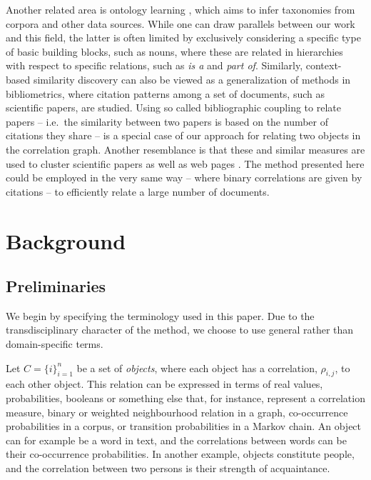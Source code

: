 \documentclass{kais}
\newcommand{\rn}[1]{\rho_{#1}}
\begin{document}
Another related area is ontology learning \cite{Wong2012ontology}, which aims to infer taxonomies 
from corpora and other data sources. While one can draw parallels between our work and this field, the latter is often limited 
by exclusively considering a specific type of basic building blocks, such as nouns, where these are related in 
 hierarchies with respect to specific relations, such as \emph{is a} and \emph{part of}. Similarly, context-based similarity
  discovery can also be viewed as a generalization of methods in bibliometrics, where citation patterns among a set of 
  documents, such as scientific papers, are studied. Using so called bibliographic coupling to relate papers  \cite{Kessler1963} 
  -- i.e.\ the similarity between two papers is based on the number of  citations they share -- is a special case of our approach 
  for relating two objects in the correlation graph. Another resemblance is that  these and similar measures are used to cluster 
  scientific papers \cite{Small1973} as well as web pages \cite{Larson96}. The method presented here could be employed in 
  the very same way -- where binary correlations are given by citations -- to efficiently relate a large number of documents.

\section{Background}
\label{sec:background}

\subsection{Preliminaries}
\label{sec:preliminaries}

We begin by specifying the terminology used in this paper. Due to the transdisciplinary character of the method, we
 choose to use general rather than domain-specific terms.

Let $C = \{i\}_{i=1}^n$ be a set of \emph{objects}, where each object has a correlation, $\rn{i,j}$, to
each other object. This relation can be expressed in terms of real values, probabilities, booleans or something
else that, for instance, represent a correlation measure, binary or weighted neighbourhood relation in a graph,
co-occurrence probabilities in a corpus, or transition probabilities in a Markov chain. An object can for example be a 
word in text, and the correlations between words can be their co-occurrence probabilities. In another example, objects 
constitute people, and the correlation between two persons is their strength of acquaintance.
\end{document}
